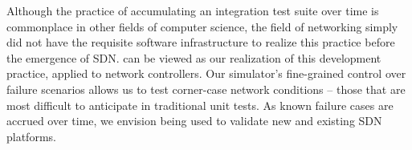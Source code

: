{Although the practice of accumulating an integration test suite over time is
commonplace in other fields of computer science, the field of networking
simply did not have the requisite software infrastructure to realize this practice before the emergence
of SDN. \Simulator{} can be viewed as our realization
of this development practice, applied to network controllers. Our simulator's fine-grained control over
failure scenarios allows us to test corner-case network conditions -- those
that are most difficult to anticipate in traditional unit tests.
As known failure cases are accrued over time, we envision \simulator{} being used to validate
new and existing SDN platforms.

}

